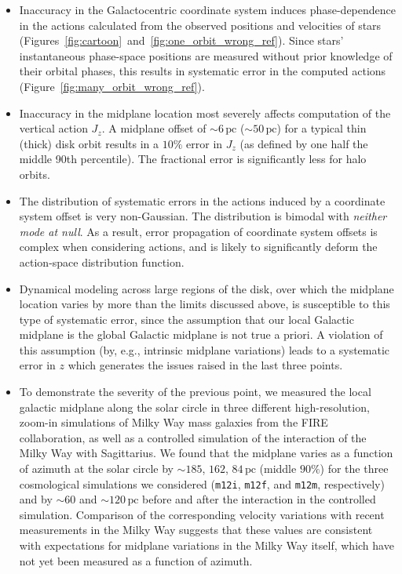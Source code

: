 \documentclass[twocolumn]{aastex62}
\newcommand{\pc}{\text{pc}}
\newcommand{\mi}{\texttt{m12i}}
\newcommand{\mf}{\texttt{m12f}}
\newcommand{\mm}{\texttt{m12m}}
\begin{document}
\begin{itemize}
\item Inaccuracy in the Galactocentric coordinate
system induces phase-dependence in the actions calculated from the observed
positions and velocities of stars
(Figures~\ref{fig:cartoon}~and~\ref{fig:one_orbit_wrong_ref}). Since stars'
instantaneous phase-space positions are measured without prior knowledge of
their orbital phases, this results in systematic error in the computed actions
(Figure~\ref{fig:many_orbit_wrong_ref}).

\item Inaccuracy in the midplane location most severely affects computation of
the vertical action $J_z$. A midplane offset of $\sim6\,\pc$ ($\sim50\,\pc$)
for a typical thin (thick) disk orbit results in a $10\%$ error in $J_z$ (as
defined by one half the middle 90th percentile). The fractional error is
significantly less for halo orbits.

\item The distribution of systematic errors in the actions induced by a
coordinate system offset is very non-Gaussian. The distribution is bimodal
with \emph{neither mode at null}. As a result, error propagation of coordinate
system offsets is complex when considering actions, and is likely to
significantly deform the action-space distribution function.

\item Dynamical modeling across large regions of the disk, over which the
midplane location varies by more than the limits discussed above, is
susceptible to this type of systematic error, since the assumption that our
local Galactic midplane is the global Galactic midplane is not true a
priori. A violation of this assumption (by, e.g., intrinsic midplane variations) leads to a systematic error in $z$ which generates the issues raised in the last three points.

\item To demonstrate the severity of the previous point, we measured the local galactic
midplane along the solar circle in three different high-resolution, zoom-in
simulations of Milky Way mass galaxies from the FIRE collaboration, as well as a controlled simulation of the interaction of the Milky Way with Sagittarius. We found
that the midplane varies as a function of azimuth at the solar circle by
$\sim185$, $162$, $84\,\pc$ (middle $90\%$) for the three cosmological simulations we considered
(\mi{}, \mf{}, and \mm{}, respectively) and by $\sim60$ and $\sim120\,\pc$ before and after the interaction in the controlled simulation. Comparison of the corresponding velocity variations with recent measurements in the Milky Way suggests that these values are consistent with expectations for midplane variations in the Milky Way itself, which have not yet been measured as a function of azimuth.


\end{itemize}
\end{document}
